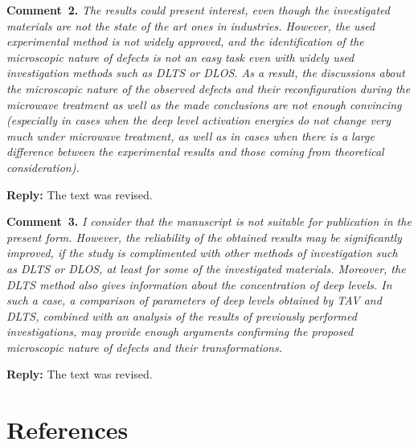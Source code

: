 \documentclass[10pt]{iopart}
\begin{document}
\vspace{1cm}
\noindent
\textcolor[rgb]{0.00,0.50,1.00}{\textbf{Comment~2.}}
\emph{The results could present interest, even though the investigated materials are not the state of the art ones in industries.
However, the used experimental method is not widely approved,
and the identification of the microscopic nature of defects is not an easy
task even with widely used investigation methods such as DLTS or DLOS.
As a result, the discussions about the microscopic nature of the observed defects
and their reconfiguration during the microwave treatment
as well as the made conclusions are not enough convincing
(especially in cases when the deep level activation
energies do not change very much under microwave treatment,
as well as in cases when there is a large difference
between the experimental results and those coming from theoretical consideration).}

\noindent
\textcolor[rgb]{0.51,0.00,0.00}{\textbf{Reply:}}
The text was revised.

\vspace{1cm}
\noindent
\textcolor[rgb]{0.00,0.50,1.00}{\textbf{Comment~3.}}
\emph{I consider that the manuscript is not suitable for publication in the present form.
However, the reliability of the obtained results may be significantly improved,
if the study is complimented with other methods of investigation such as DLTS or DLOS,
at least for some of the investigated materials.
Moreover, the DLTS method also gives information about the concentration of deep levels.
In such a case, a comparison of parameters of deep levels obtained by TAV and DLTS,
combined with an analysis of the results of previously performed investigations,
may provide enough arguments confirming the
proposed microscopic nature of defects and their transformations.}

\noindent
\textcolor[rgb]{0.51,0.00,0.00}{\textbf{Reply:}}
The text was revised.

\cite{OstrovskiiSST}

\section*{References}



\end{document}
